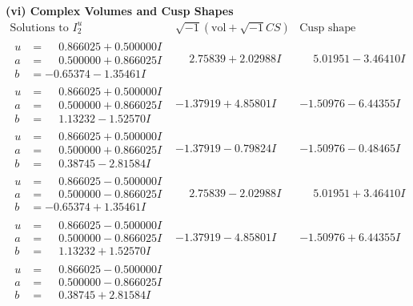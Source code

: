 \documentclass[1p]{elsarticle_modified}
\theoremstyle{definition}
\newcommand{\I}{\sqrt{-1}}
\begin{document}
\newpage\flushleft \textbf{(vi) Complex Volumes and Cusp Shapes}
$$\begin{array}{c|c|c}  
\text{Solutions to }I^u_{2}& \I (\text{vol} + \sqrt{-1}CS) & \text{Cusp shape}\\
 \hline 
\begin{aligned}
u &= \phantom{-}0.866025 + 0.500000 I \\
a &= \phantom{-}0.500000 + 0.866025 I \\
b &= -0.65374 - 1.35461 I\end{aligned}
 & \phantom{-}2.75839 + 2.02988 I & \phantom{-}5.01951 - 3.46410 I \\ \hline\begin{aligned}
u &= \phantom{-}0.866025 + 0.500000 I \\
a &= \phantom{-}0.500000 + 0.866025 I \\
b &= \phantom{-}1.13232 - 1.52570 I\end{aligned}
 & -1.37919 + 4.85801 I & -1.50976 - 6.44355 I \\ \hline\begin{aligned}
u &= \phantom{-}0.866025 + 0.500000 I \\
a &= \phantom{-}0.500000 + 0.866025 I \\
b &= \phantom{-}0.38745 - 2.81584 I\end{aligned}
 & -1.37919 - 0.79824 I & -1.50976 - 0.48465 I \\ \hline\begin{aligned}
u &= \phantom{-}0.866025 - 0.500000 I \\
a &= \phantom{-}0.500000 - 0.866025 I \\
b &= -0.65374 + 1.35461 I\end{aligned}
 & \phantom{-}2.75839 - 2.02988 I & \phantom{-}5.01951 + 3.46410 I \\ \hline\begin{aligned}
u &= \phantom{-}0.866025 - 0.500000 I \\
a &= \phantom{-}0.500000 - 0.866025 I \\
b &= \phantom{-}1.13232 + 1.52570 I\end{aligned}
 & -1.37919 - 4.85801 I & -1.50976 + 6.44355 I \\ \hline\begin{aligned}
u &= \phantom{-}0.866025 - 0.500000 I \\
a &= \phantom{-}0.500000 - 0.866025 I \\
b &= \phantom{-}0.38745 + 2.81584 I\end{aligned}

\end{array}$$
\end{document}
